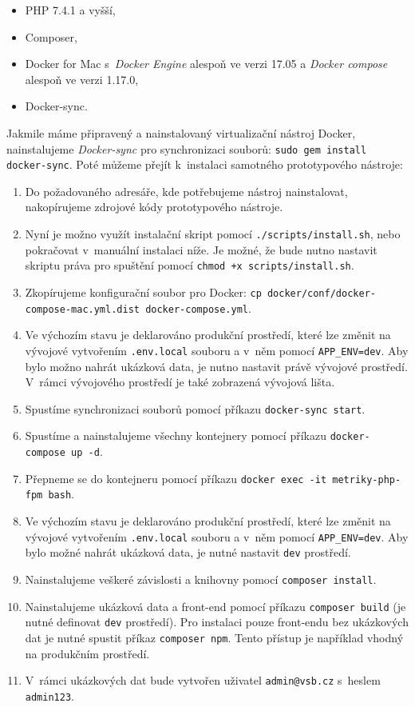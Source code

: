 \documentclass[czech,master]{diploma}
\begin{document}
\begin{itemize}
\item PHP 7.4.1 a vyšší,
\item Composer,
\item Docker for Mac s~\textit{Docker Engine} alespoň ve verzi 17.05 a \textit{Docker compose} alespoň ve verzi 1.17.0,
\item Docker-sync.
\end{itemize}

Jakmile máme připravený a nainstalovaný virtualizační nástroj Docker, nainstalujeme \textit{Docker-sync} pro synchronizaci souborů: \texttt{sudo gem install docker-sync}. Poté můžeme přejít k~instalaci samotného prototypového nástroje:

\begin{enumerate}
\item Do požadovaného adresáře, kde potřebujeme nástroj nainstalovat, nakopírujeme zdrojové kódy prototypového nástroje.
\item Nyní je možno využít instalační skript pomocí \texttt{./scripts/install.sh}, nebo pokračovat v~manuální instalaci níže. Je možné, že bude nutno nastavit skriptu práva pro spuštění pomocí \texttt{chmod +x scripts/install.sh}.
\item Zkopírujeme konfigurační soubor pro Docker: \texttt{cp docker/conf/docker-compose-mac.yml.dist docker-compose.yml}.
\item Ve výchozím stavu je deklarováno produkční prostředí, které lze změnit na vývojové vytvořením \texttt{.env.local} souboru a v~něm pomocí \texttt{APP\_ENV=dev}.  Aby bylo možno nahrát ukázková data, je nutno nastavit právě vývojové prostředí. V~rámci vývojového prostředí je také zobrazená vývojová lišta.
\item Spustíme synchronizaci souborů pomocí příkazu \texttt{docker-sync start}.
\item Spustíme a nainstalujeme všechny kontejnery pomocí příkazu \texttt{docker-compose up -d}.
\item Přepneme se do kontejneru pomocí příkazu \texttt{docker exec -it metriky-php-fpm bash}.
\item Ve výchozím stavu je deklarováno produkční prostředí, které lze změnit na vývojové vytvořením \texttt{.env.local} souboru a v~něm pomocí \texttt{APP\_ENV=dev}. Aby bylo možné nahrát ukázková data, je nutné nastavit \texttt{dev} prostředí.
\item Nainstalujeme veškeré závislosti a knihovny pomocí \texttt{composer install}.
\item Nainstalujeme ukázková data a front-end pomocí příkazu \texttt{composer build} (je nutné definovat \texttt{dev} prostředí). Pro instalaci pouze front-endu bez ukázkových dat je nutné spustit příkaz \texttt{composer npm}. Tento přístup je například vhodný na produkčním prostředí.
\item V~rámci ukázkových dat bude vytvořen uživatel \texttt{admin@vsb.cz} s~heslem \texttt{admin123}.
\end{enumerate}
\end{document}
